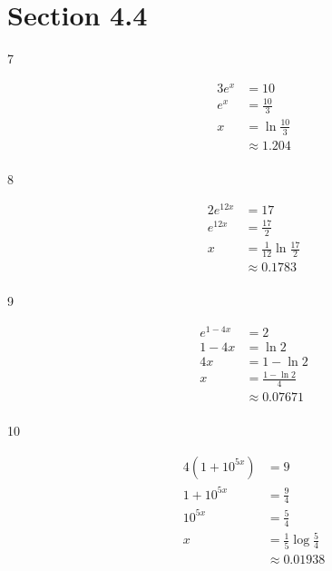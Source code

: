 \documentclass{exam}
\begin{document}
  \ifprintanswers
    \section{Section 4.4}

    \begin{description}

      \item[7]
        \begin{align*}
          3 e^x &= 10 \\
          e^x   &= \frac{10}{3} \\
          x     &= \ln \frac{10}{3} \\
                &\approx \boxed{1.204} \\
        \end{align*}

      \item[8]
        \begin{align*}
          2 e^{12x} &= 17 \\
          e^{12x}   &= \frac{17}{2} \\
          x         &= \frac{1}{12} \ln \frac{17}{2} \\
                    &\approx \boxed{0.1783} \\
        \end{align*}

      \item[9]
        \begin{align*}
          e^{1 - 4x} &= 2 \\
          1 - 4x     &= \ln 2 \\
          4x         &= 1 - \ln 2 \\
          x          &= \frac{1 - \ln 2}{4} \\
                     &\approx \boxed{0.07671} \\
        \end{align*}

      \item[10]
        \begin{align*}
          4 (1 + 10^{5x}) &= 9 \\
          1 + 10^{5x}     &= \frac{9}{4} \\
          10^{5x}         &= \frac{5}{4}\\
          x               &= \frac{1}{5} \log \frac{5}{4} \\
                          &\approx \boxed{0.01938} \\
        \end{align*}


\end{description}
\end{document}
